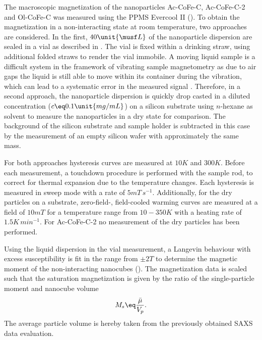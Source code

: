 \documentclass[\main/dresen_thesis.tex]{subfiles}
\begin{document}
    The macroscopic magnetization of the nanoparticles Ac-CoFe-C, Ac-CoFe-C-2 and Ol-CoFe-C was measured using the PPMS Evercool II ().
    To obtain the magnetization in a non-interacting state at room temperature, two approaches are considered.
    In the first, $40 \unit{\musf L}$ of the nanoparticle dispersion are sealed in a vial as described in .
    The vial is fixed within a drinking straw, using additional folded straws to render the vial immobile.
    A moving liquid sample is a difficult system in the framework of vibrating sample magnetometry as due to air gaps the liquid is still able to move within its container during the vibration, which can lead to a systematic error in the measured signal \cite{Boekelheide_2016_Artif}.
    Therefore, in a second approach, the nanoparticle dispersion is quickly drop casted in a diluted concentration ($c \eq 0.1 \unit{mg/mL}$) on a silicon substrate using $\textit{n}$-hexane as solvent to measure the nanoparticles in a dry state for comparison.
    The background of the silicon substrate and sample holder is subtracted in this case by the measurement of an empty silicon wafer with approximately the same mass.

    For both approaches hysteresis curves are measured at $10 \unit{K}$ and $300 \unit{K}$.
    Before each measurement, a touchdown procedure is performed with the sample rod, to correct for thermal expansion due to the temperature changes.
    Each hysteresis is measured in sweep mode with a rate of $5 \unit{mT \, s^{-1}}$.
    Additionally, for the dry particles on a substrate, zero-field-, field-cooled warming curves are measured at a field of $10 \unit{mT}$ for a temperature range from $10 - 350 \unit{K}$ with a heating rate of $1.5 \unit{K \, min^{-1}}$.
    For Ac-CoFe-C-2 no measurement of the dry particles has been performed.

    Using the liquid dispersion in the vial measurement, a Langevin behaviour with excess susceptibility is fit in the range from $\pm 2 \unit{T}$ to determine the magnetic moment of the non-interacting nanocubes ().
    The magnetization data is scaled such that the saturation magnetization is given by the ratio of the single-particle moment and nanocube volume
    \begin{align}
      M_s \eq \frac{\bar{\mu}}{V_p}.
    \end{align}
    The average particle volume is hereby taken from the previously obtained SAXS data evaluation.
\end{document}
